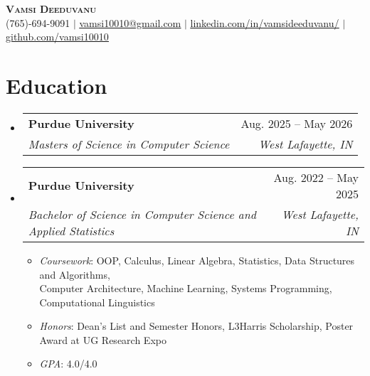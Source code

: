 \documentclass[letterpaper,11pt]{article}
\makeatletter
\newcommand{\resumeItem}[1]{
  \item\small{
    {#1 \vspace{-2pt}}
  }
}
\newcommand{\resumeSubheading}[4]{
  \vspace{-2pt}\item
    \begin{tabular*}{0.97\textwidth}[t]{l@{\extracolsep{\fill}}r}
      \textbf{\small#1} & \small#2 \\
      \textit{\small#3} & \textit{\small #4} \\
    \end{tabular*}\vspace{-7pt}
}
\newcommand{\resumeSubHeadingListStart}{\begin{itemize}[leftmargin=0.15in, label={}]}
\newcommand{\resumeSubHeadingListEnd}{\end{itemize}}
\newcommand{\resumeItemListStart}{\begin{itemize}}
\newcommand{\resumeItemListEnd}{\end{itemize}\vspace{-5pt}}
\makeatother
\begin{document}
\begin{center}
    \textbf{\Huge \scshape Vamsi Deeduvanu} \\ \vspace{1pt}
    \small (765)-694-9091 $|$ \href{mailto:vamsi10010@gmail.com}{\underline{vamsi10010@gmail.com}} $|$ 
    \href{https://www.linkedin.com/in/vamsideeduvanu}{\underline{linkedin.com/in/vamsideeduvanu/}} $|$
    \href{https://github.com/vamsi10010}{\underline{github.com/vamsi10010}}
\end{center}



\section{Education}
  \resumeSubHeadingListStart
    \resumeSubheading
      {Purdue University}{Aug. 2025 -- May 2026}
      {Masters of Science in Computer Science}{West Lafayette, IN}
    \resumeSubheading
      {Purdue University}{Aug. 2022 -- May 2025}
      {Bachelor of Science in Computer Science and Applied Statistics}{West Lafayette, IN}
      \resumeItemListStart
        \resumeItem{\textit{Coursework}: OOP, Calculus, Linear Algebra, Statistics, Data Structures and Algorithms, \\Computer Architecture,
        Machine Learning, Systems Programming, Computational Linguistics
        }
        \resumeItem{\textit{Honors}: Dean's List and Semester Honors, L3Harris Scholarship, Poster Award at UG Research Expo}
        \resumeItem{\textit{GPA}: 4.0/4.0}
      \resumeItemListEnd
  \resumeSubHeadingListEnd


\end{document}
